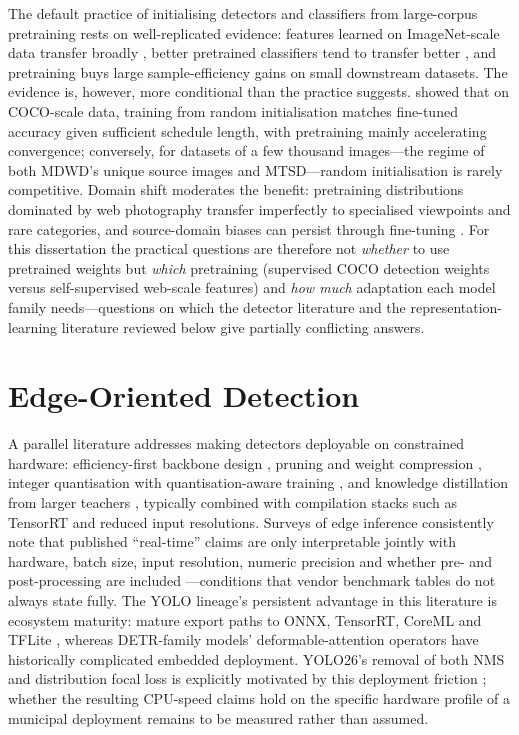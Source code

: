 The default practice of initialising detectors and classifiers from large-corpus pretraining rests on well-replicated evidence: features learned on ImageNet-scale data transfer broadly \citep{yosinski2014transferable}, better pretrained classifiers tend to transfer better \citep{kornblith2019better}, and pretraining buys large sample-efficiency gains on small downstream datasets. The evidence is, however, more conditional than the practice suggests. \citet{he2019rethinking} showed that on COCO-scale data, training from random initialisation matches fine-tuned accuracy given sufficient schedule length, with pretraining mainly accelerating convergence; conversely, for datasets of a few thousand images---the regime of both MDWD's unique source images and MTSD---random initialisation is rarely competitive. Domain shift moderates the benefit: pretraining distributions dominated by web photography transfer imperfectly to specialised viewpoints and rare categories, and source-domain biases can persist through fine-tuning \citep{torralba2011unbiased,devries2019does}. For this dissertation the practical questions are therefore not \emph{whether} to use pretrained weights but \emph{which} pretraining (supervised COCO detection weights versus self-supervised web-scale features) and \emph{how much} adaptation each model family needs---questions on which the detector literature and the representation-learning literature reviewed below give partially conflicting answers.

\section{Edge-Oriented Detection}
\label{sec:lr-edge}

A parallel literature addresses making detectors deployable on constrained hardware: efficiency-first backbone design \citep{howard2017mobilenets,sandler2018mobilenetv2}, pruning and weight compression \citep{han2016deep}, integer quantisation with quantisation-aware training \citep{jacob2018quantization}, and knowledge distillation from larger teachers \citep{hinton2015distilling}, typically combined with compilation stacks such as TensorRT and reduced input resolutions. Surveys of edge inference consistently note that published ``real-time'' claims are only interpretable jointly with hardware, batch size, input resolution, numeric precision and whether pre- and post-processing are included \citep{chen2019deep,murshed2021machine}---conditions that vendor benchmark tables do not always state fully. The YOLO lineage's persistent advantage in this literature is ecosystem maturity: mature export paths to ONNX, TensorRT, CoreML and TFLite \citep{ultralytics2024yolo11,jocher2026yolo26}, whereas DETR-family models' deformable-attention operators have historically complicated embedded deployment. YOLO26's removal of both NMS and distribution focal loss is explicitly motivated by this deployment friction \citep{jocher2026yolo26}; whether the resulting CPU-speed claims hold on the specific hardware profile of a municipal deployment remains to be measured rather than assumed.


